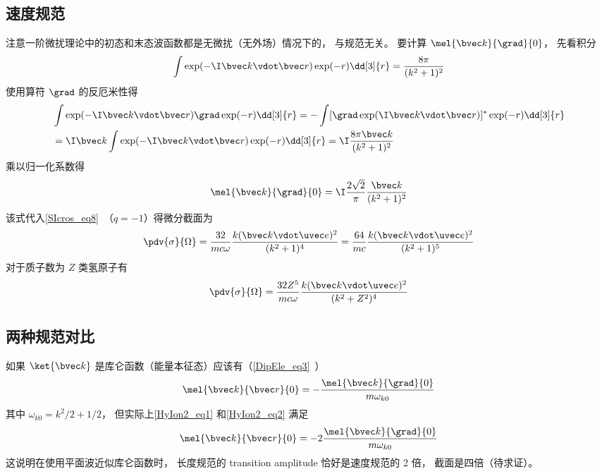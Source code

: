 \subsection{速度规范}
注意一阶微扰理论中的初态和末态波函数都是无微扰（无外场）情况下的， 与规范无关。 要计算 $\mel{\bvec k}{\grad}{0}$， 先看积分
\begin{equation}
\int \exp(-\I \bvec k \vdot \bvec r) \exp(-r) \dd[3]{r} = \frac{8\pi }{(k^2 + 1)^2}
\end{equation}
使用算符 $\grad$ 的反厄米性得
\begin{equation}
\begin{aligned}
&\int \exp(-\I \bvec k \vdot \bvec r) \grad \exp(-r) \dd[3]{r}
= -\int [\grad \exp(\I \bvec k \vdot \bvec r)]^* \exp(-r) \dd[3]{r}\\
&= \I \bvec k \int \exp(-\I \bvec k \vdot \bvec r) \exp(-r) \dd[3]{r}
= \I \frac{8 \pi  \bvec k}{(k^2 + 1)^2}
\end{aligned}
\end{equation}
乘以归一化系数得
\begin{equation}\label{HyIon2_eq2}
\mel{\bvec k}{\grad}{0} = \I\frac{2\sqrt{2}}{\pi}\frac{\bvec k}{(k^2 + 1)^2}
\end{equation}
该式代入\autoref{SIcros_eq8}~（$q = -1$）得微分截面为
\begin{equation}
\pdv{\sigma}{\Omega} = \frac{32}{mc\omega} \frac{k(\bvec k \vdot \uvec e)^2}{(k^2 + 1)^4}
= \frac{64}{mc} \frac{k(\bvec k \vdot \uvec e)^2}{(k^2 + 1)^5}
\end{equation}
对于质子数为 $Z$ 类氢原子有
\begin{equation}
\pdv{\sigma}{\Omega} = \frac{32 Z^5}{mc\omega} \frac{k(\bvec k \vdot \uvec e)^2}{(k^2 + Z^2)^4}
\end{equation}

\subsection{两种规范对比}
如果 $\ket{\bvec k}$ 是库仑函数（能量本征态）应该有（\autoref{DipEle_eq3}~）
\begin{equation}
\mel{\bvec k}{\bvec r}{0} = -\frac{\mel{\bvec k}{\grad}{0}}{m\omega_{k0}}
\end{equation}
其中 $\omega_{k0} = k^2/2 + 1/2$， 但实际上\autoref{HyIon2_eq1} 和\autoref{HyIon2_eq2} 满足
\begin{equation}
\mel{\bvec k}{\bvec r}{0} = -2\frac{\mel{\bvec k}{\grad}{0}}{m\omega_{k0}}
\end{equation}
这说明在使用平面波近似库仑函数时， 长度规范的 transition amplitude 恰好是速度规范的 2 倍， 截面是四倍（待求证）。


